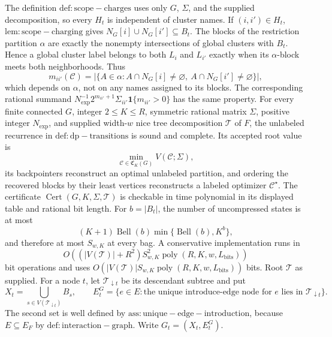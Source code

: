 The definition \(\mathrm{def:scope-charges}\) uses only \(G\), \(\Sigma\), and the supplied decomposition, so every \(H_t\) is independent of cluster names.  If \((i,i')\in H_t\), \(\mathrm{lem:scope-charging}\) gives \(N_G[i]\cup N_G[i']\subseteq B_t\).  The blocks of the restriction partition \(\alpha\) are exactly the nonempty intersections of global clusters with \(B_t\).  Hence a global cluster label belongs to both \(L_i\) and \(L_{i'}\) exactly when its \(\alpha\)-block meets both neighborhoods.  Thus
\[
 m_{ii'}(\mathcal C)
 =\bigl|\{A\in\alpha:A\cap N_G[i]\ne\varnothing,
                         \ A\cap N_G[i']\ne\varnothing\}\bigr|,
\]
which depends on \(\alpha\), not on any names assigned to its blocks.  The corresponding rational summand \(N_{\exp}^{-1}2^{m_{ii'}+1}\Sigma_{ii'}\mathbf 1\{m_{ii'}>0\}\) has the same property.
For every finite connected \(G\), integer \(2\le K\le R\), symmetric rational matrix \(\Sigma\), positive integer \(N_{\exp}\), and supplied width-\(w\) nice tree decomposition \(\mathcal T\) of \(F\), the unlabeled recurrence in \(\mathrm{def:dp-transitions}\) is sound and complete.  Its accepted root value is
\[
 \min_{\mathcal C\in\mathfrak C_K(G)}V(\mathcal C;\Sigma),
\]
its backpointers reconstruct an optimal unlabeled partition, and ordering the recovered blocks by their least vertices reconstructs a labeled optimizer \(\mathcal C^\star\).  The certificate \(\operatorname{Cert}(G,K,\Sigma,\mathcal T)\) is checkable in time polynomial in its displayed table and rational bit length.  For \(b=|B_t|\), the number of uncompressed states is at most
\[
 (K+1)\operatorname{Bell}(b)\min\{\operatorname{Bell}(b),K^b\},
\]
and therefore at most \(S_{w,K}\) at every bag.  A conservative implementation runs in
\[
 O\!\left((|V(\mathcal T)|+R^2)S_{w,K}^2
 \operatorname{poly}(R,K,w,L_{\mathrm{bits}})\right)
\]
bit operations and uses \(O\!\left(|V(\mathcal T)|S_{w,K}\operatorname{poly}(R,K,w,L_{\mathrm{bits}})\right)\) bits.
Root \(\mathcal T\) as supplied.  For a node \(t\), let \(\mathcal T_{\downarrow t}\) be its descendant subtree and put
\[
 X_t=\bigcup_{s\in V(\mathcal T_{\downarrow t})}B_s,
 \qquad
 E_t^G=\{e\in E:\text{the unique introduce-edge node for }e
                   \text{ lies in }\mathcal T_{\downarrow t}\}.
\tag{1}
\]
The second set is well defined by \(\mathrm{ass:unique-edge-introduction}\), because \(E\subseteq E_F\) by \(\mathrm{def:interaction-graph}\).  Write \(G_t=(X_t,E_t^G)\).

